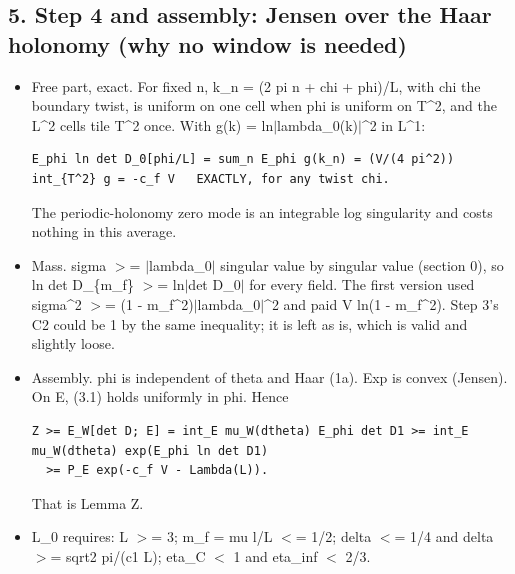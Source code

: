 \documentclass[11pt,a4paper]{article}
\begin{document}
\subsection*{5. Step 4 and assembly: Jensen over the Haar holonomy (why no window is needed)}
\begin{itemize}
\item{} Free part, exact. For fixed n, k\_n = (2 pi n + chi + phi)/L, with chi the boundary twist, is uniform on one cell
when phi is uniform on T\textasciicircum{}2, and the L\textasciicircum{}2 cells tile T\textasciicircum{}2 once. With g(k) = ln$|$lambda\_0(k)$|$\textasciicircum{}2 in L\textasciicircum{}1:
\begin{Verbatim}[breaklines=true,breakanywhere=true,fontsize=\small]
E_phi ln det D_0[phi/L] = sum_n E_phi g(k_n) = (V/(4 pi^2)) int_{T^2} g = -c_f V   EXACTLY, for any twist chi.
\end{Verbatim}

The periodic-holonomy zero mode is an integrable log singularity and costs nothing in this average.
\item{} Mass. sigma $>$= $|$lambda\_0$|$ singular value by singular value (section 0), so ln det D\_\{m\_f\} $>$= ln$|$det D\_0$|$ for every
field. The first version used sigma\textasciicircum{}2 $>$= (1 - m\_f\textasciicircum{}2)$|$lambda\_0$|$\textasciicircum{}2 and paid V ln(1 - m\_f\textasciicircum{}2). Step 3's C2 could be 1
by the same inequality; it is left as is, which is valid and slightly loose.
\item{} Assembly. phi is independent of theta and Haar (1a). Exp is convex (Jensen). On E, (3.1) holds uniformly in phi.
Hence
\begin{Verbatim}[breaklines=true,breakanywhere=true,fontsize=\small]
Z >= E_W[det D; E] = int_E mu_W(dtheta) E_phi det D1 >= int_E mu_W(dtheta) exp(E_phi ln det D1)
  >= P_E exp(-c_f V - Lambda(L)).
\end{Verbatim}

That is Lemma Z.
\item{} L\_0 requires: L $>$= 3; m\_f = mu l/L $<$= 1/2; delta $<$= 1/4 and delta $>$= sqrt2 pi/(c1 L); eta\_C $<$ 1 and
eta\_inf $<$ 2/3.
\end{itemize}
\end{document}
